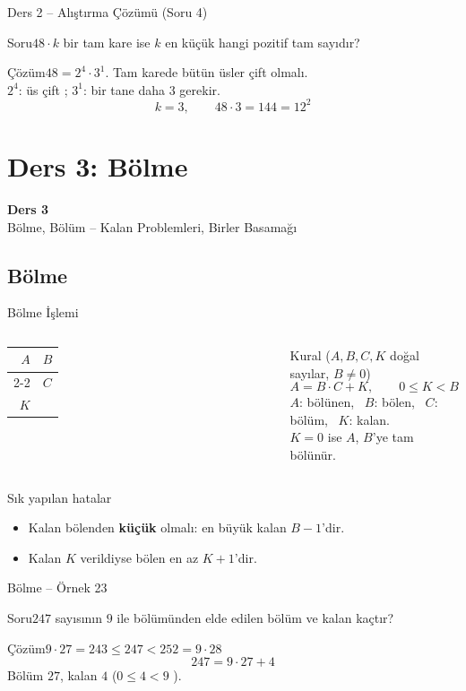 \documentclass[aspectratio=169,11pt,handout]{beamer}
\newcommand{\soru}[3]{%
\begin{frame}{#1}
  \begin{block}{Soru}\large #2\end{block}
  \pause
  \begin{exampleblock}{Çözüm}\large #3\end{exampleblock}
\end{frame}}
\begin{document}
\soru{Ders 2 -- Alıştırma Çözümü (Soru 4)}
{\(48\cdot k\) bir tam kare ise \(k\) en küçük hangi pozitif tam sayıdır?}
{\(48=2^4\cdot 3^1\). Tam karede bütün üsler çift olmalı.\\[3pt]
\(2^4\): üs çift \checkmark; \quad \(3^1\): bir tane daha \(3\) gerekir.
\[k=3,\qquad 48\cdot 3=144=12^2\]}


\section{Ders 3: Bölme}
\begin{frame}
\centering\Large\color{anamavi}\textbf{Ders 3}\\[6pt]\normalsize Bölme, Bölüm -- Kalan Problemleri, Birler Basamağı
\end{frame}

\subsection{Bölme}
\begin{frame}{Bölme İşlemi}
\begin{columns}[c]
\centering\Large
\begin{tabular}{r|l}
\(A\) & \(B\)\\\cline{2-2}
 & \(C\)\\
\(K\) &
\end{tabular}
\begin{block}{Kural (\(A,B,C,K\) doğal sayılar, \(B\neq 0\))}
\[A=B\cdot C+K,\qquad 0\le K<B\]
\(A\): bölünen, \ \(B\): bölen, \ \(C\): bölüm, \ \(K\): kalan.\\
\(K=0\) ise \(A\), \(B\)'ye tam bölünür.
\end{block}
\end{columns}
\begin{alertblock}{Sık yapılan hatalar}
\begin{itemize}
\item Kalan bölenden \textbf{küçük} olmalı: en büyük kalan \(B-1\)'dir.
\item Kalan \(K\) verildiyse bölen en az \(K+1\)'dir.
\end{itemize}
\end{alertblock}
\end{frame}

\soru{Bölme -- Örnek 23}
{\(247\) sayısının \(9\) ile bölümünden elde edilen bölüm ve kalan kaçtır?}
{\(9\cdot 27=243\le 247<252=9\cdot 28\)
\[247=9\cdot 27+4\]
Bölüm \(27\), kalan \(4\) \quad (\(0\le 4<9\) \checkmark).}
\end{document}
